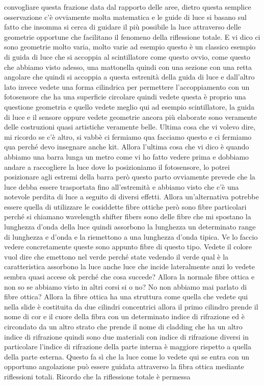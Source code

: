 {convogliare questa frazione data dal rapporto delle aree, dietro questa semplice osservazione c'è ovviamente molta matematica e le guide di luce si basano sul fatto che insomma si cerca di guidare il più possibile la luce attraverso delle geometrie opportune che facilitano il fenomeno della riflessione totale. E vi dico ci sono geometrie molto varia, molto varie ad esempio questo è un classico esempio di guida di luce che si accoppia al scintillatore come questo ovvio, come questo che abbiamo visto adesso, una mattonella quindi con una sezione con una retta angolare che quindi si accoppia a questa estrenità della guida di luce e dall'altro lato invece vedete una forma cilindrica per permettere l'accoppiamento con un fotosensore che ha una superficie circolare quindi vedete questa è proprio una questione geometria e quello vedete meglio qui ad esempio scintillatore, la guida di luce e il sensore oppure vedete geometrie ancora più elaborate sono veramente delle costruzioni quasi artistiche veramente belle. Ultima cosa che vi volevo dire, mi ricordo se c'è altro, si vabbè ci fermiamo qua facciamo questo e ci fermiamo qua perché devo insegnare anche kit. Allora l'ultima cosa che vi dico è quando abbiamo una barra lunga un metro come vi ho fatto vedere prima e dobbiamo andare a raccogliere la luce dove lo posizioniamo il fotosensore, lo potrei posizionare agli estremi della barra però questo parto ovviamente prevede che la luce debba essere trasportata fino all'estremità e abbiamo visto che c'è una notevole perdita di luce a seguito di diversi effetti. Allora un'alternativa potrebbe essere quella di utilizzare le cosiddette fibre ottiche però sono fibre particolari perché si chiamano wavelength shifter fibers sono delle fibre che mi spostano la lunghezza d'onda della luce quindi assorbono la lunghezza un determinato range di lunghezza e d'onda e la riemettono a una lunghezza d'onda tipica. Ve lo faccio vedere concretamente queste sono appunto fibre di questo tipo. Vedete il colore vuol dire che emettono nel verde perché state vedendo il verde qual è la caratteristica assorbono la luce anche luce che incide lateralmente anzi lo vedete sembra quasi accese ok perché che cosa succede? Allora la normale fibre ottica e non so se abbiamo visto in altri corsi si o no? No non abbiamo mai parlato di fibre ottica? Allora la fibre ottica ha una struttura come quella che vedete qui nella slide è costituita da due cilindri concentrici allora il primo cilindro prende il nome di cor e il cuore della fibra con un determinato indice di rifrazione ed è circondato da un altro strato che prende il nome di cladding che ha un altro indice di rifrazione quindi sono due materiali con indice di rifrazione diversi in particolare l'indice di rifrazione della parte interna è maggiore rispetto a quella della parte esterna. Questo fa sì che la luce come lo vedete qui se entra con un opportuno angolazione può essere guidata attraverso la fibra ottica mediante riflessioni totali. Ricordo che la riflessione totale è permessa 

}
